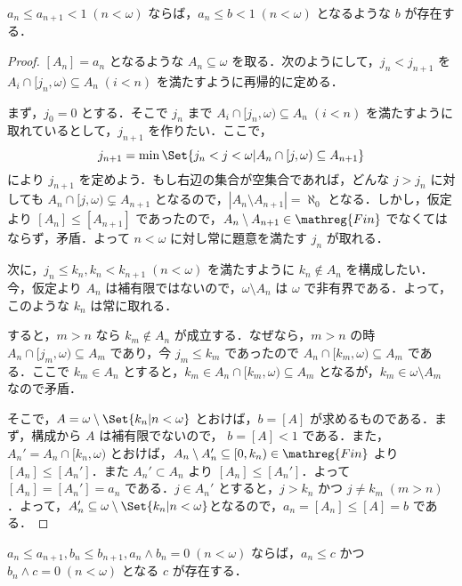 \documentclass[a4j,xelatex,ja=standard]{bxjsarticle}
\newcommand{\Fin}{\mathreg{Fin}}
\begin{document}
\begin{lemma}\label{lem:01}
 $a_n \leq a_{n+1} < 1 \; (n < \omega)$ ならば，$a_n \leq b < 1 \; (n < \omega)$ となるような $b$ が存在する．
\end{lemma}
\begin{proof}
 $[A_n] = a_n$ となるような $A_n \subseteq \omega$ を取る．次のようにして，$j_n < j_{n+1}$ を $A_i \cap [j_n, \omega) \subseteq A_n \; (i < n)$ を満たすように再帰的に定める．

 まず，$j_0 = 0$ とする．そこで $j_n$ まで $A_i \cap [j_n, \omega) \subseteq A_n \; (i < n)$ を満たすように取れているとして，$j_{n+1}$ を作りたい．ここで，
 \[
  j_{n+1} = \min \Set{j_n < j < \omega | A_n \cap [j, \omega) \subseteq A_{n+1}}
 \]
 により $j_{n+1}$ を定めよう．もし右辺の集合が空集合であれば，どんな $j > j_n$ に対しても $A_n \cap [j, \omega) \subsetneq A_{n+1}$ となるので，$|A_n \setminus A_{n+1}| = \aleph_0$ となる．しかし，仮定より $[A_n] \leq [A_{n+1}]$ であったので，$A_n \setminus A_{n+1} \in \Fin$ でなくてはならず，矛盾．よって $n < \omega$ に対し常に題意を満たす $j_n$ が取れる．

 次に，$j_n \leq k_n, k_n < k_{n+1} \; (n < \omega)$ を満たすように $k_n \notin A_n$ を構成したい．今，仮定より $A_n$ は補有限ではないので，$\omega \setminus A_n$ は $\omega$ で非有界である．よって，このような $k_n$ は常に取れる．

 すると，$m > n$ なら $k_m \notin A_n$ が成立する．なぜなら，$m > n$ の時 $A_n \cap [j_m, \omega) \subseteq A_m$ であり，今 $j_m \leq k_m$ であったので $A_n \cap [k_m, \omega) \subseteq A_m$ である．ここで $k_m \in A_n$ とすると，$k_m \in A_n \cap [k_m, \omega) \subseteq A_m$ となるが，$k_m \in \omega \setminus A_m$ なので矛盾．

 そこで，$A = \omega \setminus \Set{k_n | n < \omega}$ とおけば，$b = [A]$ が求めるものである．まず，構成から $A$ は補有限でないので， $b = [A] < 1$ である．また，$A_n' = A_n \cap [k_n, \omega)$ とおけば，$A_n \setminus A_n' \subseteq [0, k_n) \in \Fin$ より $[A_n] \leq [A_n']$．また $A_n' \subset A_n$ より $[A_n] \leq [A_n']$．よって $[A_n] = [A_n'] = a_n$ である．$j \in A_n'$ とすると，$j > k_n$ かつ $j \neq k_m \; (m > n)$．よって，$A_n' \subseteq \omega \setminus \Set{ k_n | n < \omega }$となるので，$a_n = [A_n] \leq [A] = b$ である．
 \mbox{}
\end{proof}

\begin{lemma}\label{lem:02}
 $a_n \leq a_{n+1}, b_n \leq b_{n+1}, a_n \wedge b_n = 0 \; (n < \omega)$
 ならば，$a_n \leq c$ かつ $b_n \wedge c = 0 \; (n < \omega)$ となる $c$ が存在する．
\end{lemma}
\end{document}
